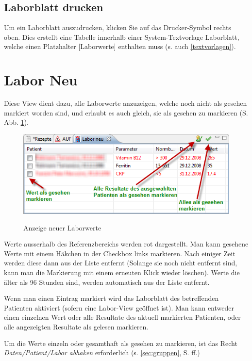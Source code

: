 \subsection{Laborblatt drucken}
Um ein Laborblatt auszudrucken, klicken Sie auf das Drucker-Symbol rechts oben. Dies erstellt eine Tabelle innerhalb einer System-Textvorlage \glqq Laborblatt\grqq{}, welche einen Platzhalter [Laborwerte] enthalten muss (s. auch \ref{textvorlagen}).

\section{Labor Neu}
Diese View dient dazu, alle Laborwerte anzuzeigen, welche noch nicht als \glqq gesehen\grqq{} markiert worden sind, und erlaubt es auch gleich, sie als gesehen zu markieren (S. Abb. \ref{fig:labneu}).

\begin{figure}
  \includegraphics{images/labneu1}\\
  \caption{Anzeige neuer Laborwerte}\label{fig:labneu}
\end{figure}

Werte ausserhalb des Referenzbereichs werden rot dargestellt. Man kann gesehene Werte mit einem Häkchen in der Checkbox links markieren. Nach einiger Zeit werden diese dann aus der Liste entfernt (Solange sie noch nicht entfernt sind, kann man die Markierung mit einem erneuten Klick wieder löschen). Werte die älter als 96 Stunden sind, werden automatisch aus der Liste entfernt.

Wenn man einen Eintrag markiert wird das Laborblatt des betreffenden Patienten aktiviert (sofern eine Labor-View geöffnet ist). Man kann entweder einen einzelnen Wert oder alle Resultate des aktuell markierten Patienten, oder alle angezeigten Resultate als gelesen markieren.

Um die Werte einzeln oder gesamthaft als gesehen zu markieren, ist das Recht \textit{Daten/Patient/Labor abhaken} erforderlich (s. \ref{sec:gruppen}, S. \pageref{sec:gruppen}ff.)

